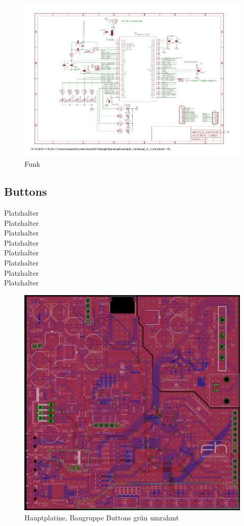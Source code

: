 \documentclass[a4paper]{scrartcl}
\begin{document}
\begin{figure}[H]\centering
\includegraphics[page=3, angle=90, width=\linewidth]{../eagle/Mainboard/watchplb_mainboard_v1_0.pdf}
\caption{Funk}
\label{fig:abb1}
\end{figure}

\subsection{Buttons}

Platzhalter\\Platzhalter\\Platzhalter\\Platzhalter\\Platzhalter\\Platzhalter\\
Platzhalter\\Platzhalter

\begin{figure}[H]\centering
\includegraphics[page=1, angle=0, width=\linewidth]{../Documentation/pics/mainboard_buttons.png}
\caption{Hauptplatine, Baugruppe Buttons grün umrahmt}
\label{fig:abb1}
\end{figure}
\end{document}
